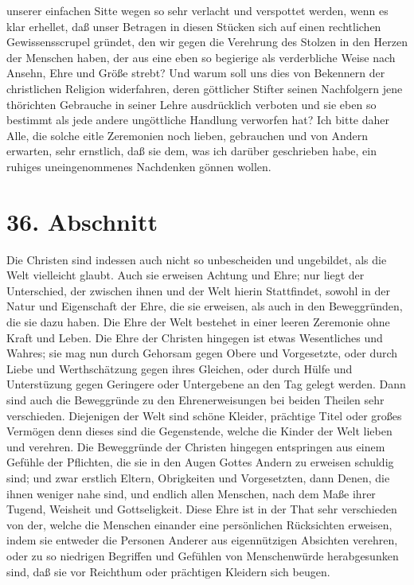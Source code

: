 unserer einfachen Sitte wegen so sehr verlacht und verspottet werden, wenn es
klar erhellet, daß unser Betragen in diesen Stücken sich auf einen rechtlichen
Gewissensscrupel gründet, den wir gegen die Verehrung des Stolzen in den Herzen
der Menschen haben, der aus eine eben so begierige als verderbliche Weise nach
Ansehn, Ehre und Größe strebt? Und warum soll uns dies von Bekennern der
christlichen Religion widerfahren, deren göttlicher Stifter seinen Nachfolgern
jene thörichten Gebrauche in seiner Lehre ausdrücklich verboten und sie eben so
bestimmt als jede andere ungöttliche Handlung verworfen hat? Ich bitte daher
Alle, die solche eitle Zeremonien noch lieben, gebrauchen und von Andern
erwarten, sehr ernstlich, daß sie dem, was ich darüber geschrieben habe, ein
ruhiges uneingenommenes  Nachdenken gönnen wollen.

\section{36. Abschnitt}

Die Christen sind indessen auch nicht so unbescheiden und ungebildet, als die
Welt vielleicht glaubt. Auch sie erweisen Achtung und Ehre; nur liegt der
Unterschied, der zwischen ihnen und der Welt hierin Stattfindet, sowohl in der
Natur und Eigenschaft der Ehre, die sie erweisen, als auch in den Beweggründen,
die sie dazu haben. Die Ehre der Welt bestehet in einer leeren Zeremonie ohne
Kraft und Leben. Die Ehre der Christen hingegen ist etwas Wesentliches und
Wahres; sie mag nun durch Gehorsam gegen Obere und Vorgesetzte, oder durch Liebe
und Werthschätzung gegen ihres Gleichen, oder durch Hülfe und Unterstüzung gegen
Geringere oder Untergebene an den Tag gelegt werden. Dann sind auch die
Beweggründe zu den Ehrenerweisungen bei beiden Theilen sehr verschieden.
Diejenigen der Welt sind schöne Kleider, prächtige Titel oder großes Vermögen
denn dieses sind die Gegenstende, welche die Kinder der Welt lieben und
verehren. Die Beweggründe der Christen hingegen entspringen aus einem Gefühle
der Pflichten, die sie in den Augen Gottes Andern zu erweisen schuldig sind; und
zwar erstlich Eltern, Obrigkeiten und Vorgesetzten, dann Denen, die ihnen
weniger nahe sind, und endlich allen Menschen, nach dem Maße ihrer Tugend,
Weisheit und Gottseligkeit. Diese Ehre ist in der That sehr verschieden von der,
welche die Menschen einander eine persönlichen Rücksichten erweisen, indem sie
entweder die Personen Anderer aus eigennützigen Absichten verehren, oder zu so
niedrigen Begriffen und Gefühlen von Menschenwürde herabgesunken sind, daß sie
vor Reichthum oder prächtigen Kleidern sich beugen.

